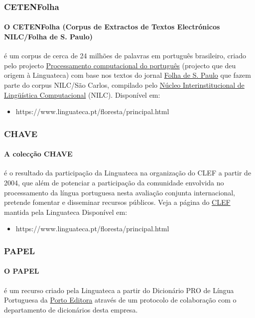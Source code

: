 \documentclass[a4paper, 10pt]{article}
\begin{document}
            \subsubsection{CETENFolha}
            	\paragraph{O CETENFolha (Corpus de Extractos de Textos Electrónicos NILC/Folha de S. Paulo)}é um corpus de cerca de 24 milhões de palavras em português brasileiro, criado pelo projecto \href{https://www.linguateca.pt/proc_comp_port.html}{Processamento computacional do português} (projecto que deu origem à Linguateca) com base nos textos do jornal \href{https://www.folha.uol.com.br/}{Folha de S. Paulo} que fazem parte do corpus NILC/São Carlos, compilado pelo \href{http://www.nilc.icmsc.sc.usp.br/}{Núcleo Interinstitucional de Lingüística Computacional} (NILC).
                Disponível em:
            	\begin{itemize}
				\item https://www.linguateca.pt/floresta/principal.html

			    \end{itemize}
            \subsubsection{CHAVE}
            	\paragraph{A colecção CHAVE} é o resultado da participação da Linguateca na organização do CLEF a partir de 2004, que além de potenciar a participação da comunidade envolvida no processamento da língua portuguesa nesta avaliação conjunta internacional, pretende fomentar e disseminar recursos públicos. Veja a página do \href{https://www.linguateca.pt/CLEF/}{CLEF} mantida pela Linguateca
            	Disponível em:
            	\begin{itemize}
				\item https://www.linguateca.pt/floresta/principal.html

			    \end{itemize}
            \subsubsection{PAPEL}
            	\paragraph{O PAPEL} é um recurso criado pela Linguateca a partir do Dicionário PRO de Língua Portuguesa da \href{http://www.portoeditora.pt/}{Porto Editora} através de um protocolo de colaboração com o departamento de dicionários desta empresa.
\end{document}
